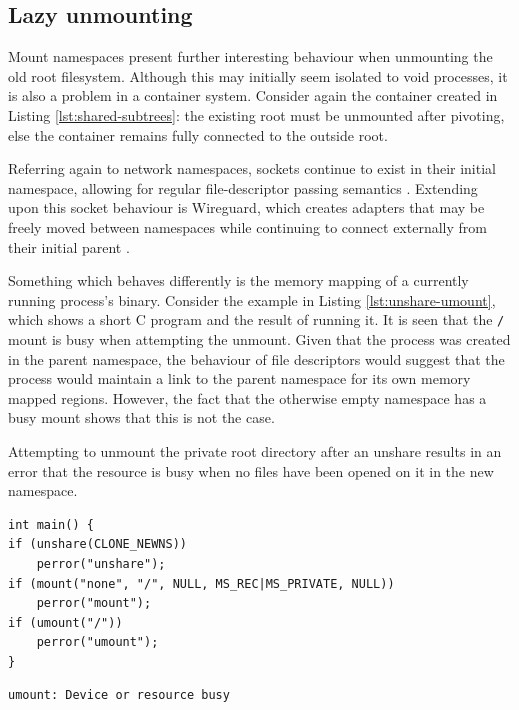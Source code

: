 \documentclass[12pt,a4paper,twoside]{report}
\begin{document}
\subsection{Lazy unmounting}
\label{sec:voiding-mount-lazy-unmount}

Mount namespaces present further interesting behaviour when unmounting the old root filesystem. Although this may initially seem isolated to void processes, it is also a problem in a container system. Consider again the container created in Listing \ref{lst:shared-subtrees}: the existing root must be unmounted after pivoting, else the container remains fully connected to the outside root.

Referring again to network namespaces, sockets continue to exist in their initial namespace, allowing for regular file-descriptor passing semantics \citep{biederman_re_2007}. Extending upon this socket behaviour is Wireguard, which creates adapters that may be freely moved between namespaces while continuing to connect externally from their initial parent \citep[§7.3]{donenfeld_wireguard_2017}.

Something which behaves differently is the memory mapping of a currently running process's binary. Consider the example in Listing \ref{lst:unshare-umount}, which shows a short C program and the result of running it. It is seen that the \texttt{/} mount is busy when attempting the unmount. Given that the process was created in the parent namespace, the behaviour of file descriptors would suggest that the process would maintain a link to the parent namespace for its own memory mapped regions. However, the fact that the otherwise empty namespace has a busy mount shows that this is not the case.

\begin{listing}
\label{lst:unshare-umount}
\caption{Attempting to unmount the private root directory after an unshare results in an error that the resource is busy when no files have been opened on it in the new namespace.}

\begin{verbatim}
int main() {
if (unshare(CLONE_NEWNS))
	perror("unshare");
if (mount("none", "/", NULL, MS_REC|MS_PRIVATE, NULL))
	perror("mount");
if (umount("/"))
	perror("umount");
}
\end{verbatim}
\begin{verbatim}
umount: Device or resource busy
\end{verbatim}

\end{listing}
\end{document}
